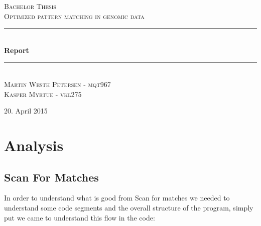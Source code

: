\documentclass[12pt]{article}
\newcommand{\HRule}{\rule{\linewidth}{0.5mm}}
\begin{document}
\begin{titlepage}
\begin{center}

\textsc{\Large Bachelor Thesis \\ Optimized pattern matching in genomic data\\[0.3cm]}
\HRule \\[0.4cm]
{ \LARGE \bfseries Report}\\[0.4cm]
\HRule \\[1.2cm]
\textsc{\large Martin Westh Petersen - mqt967 \\ Kasper Myrtue - vkl275}\\[1.0cm]
\end{center}
\begin{center}
\vfill
{\large 20. April 2015}
\end{center}
\end{titlepage}
\tableofcontents
\section{Analysis}
\subsection{Scan For Matches}
In order to understand what is good from Scan for matches we needed to understand some code segments and the overall structure of the program, simply put we came to understand this flow in the code:
\end{document}
